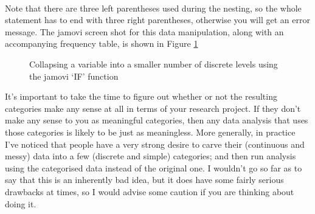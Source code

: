\noindent
{} \\

Note that there are three left parentheses used during the nesting, so the whole statement has to end with three right parentheses, otherwise you will get an error message. The jamovi screen shot for this data manipulation, along with an accompanying frequency table, is shown in Figure \ref{fig:agecats} 



\begin{figure}[h!!]
\begin{center}
\caption{Collapsing a variable into a smaller number of discrete levels using the jamovi `IF' function}
\label{fig:agecats}
\HR
\end{center}
\end{figure}


It's important to take the time to figure out whether or not the resulting categories make any sense at all in terms of your research project. If they don't make any sense to you as meaningful categories, then any data analysis that uses those categories is likely to be just as meaningless. More generally, in practice I've noticed that people have a very strong desire to carve their (continuous and messy) data into a few (discrete and simple) categories; and then run analysis using the categorised data instead of the original one. I wouldn't go so far as to say that this is an inherently bad idea, but it does have some fairly serious drawbacks at times, so I would advise some caution if you are thinking about doing it. 


